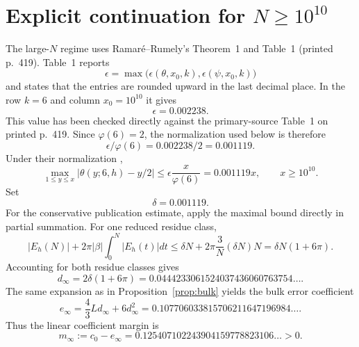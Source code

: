\documentclass[11pt]{article}
\theoremstyle{definition}
\newcommand{\RR}{Ramar\'{e}--Rumely}
\newcommand{\abs}[1]{\left|#1\right|}
\begin{document}
\section{Explicit continuation for $N\ge10^{10}$}\label{sec:largeN}

The large-$N$ regime uses \RR's Theorem~1 and Table~1 (printed p.~419). Table~1 reports
\[
\epsilon=\max\bigl(\epsilon(\theta,x_0,k),\epsilon(\psi,x_0,k)\bigr)
\]
and states that the entries are rounded upward in the last decimal place. In the row $k=6$ and column $x_0=10^{10}$ it gives
\begin{equation}\label{eq:epsilon}
\boxed{\epsilon=0.002238.}
\end{equation}
This value has been checked directly against the primary-source Table~1 on printed p.~419. Since $\varphi(6)=2$, the normalization used below is therefore
\[
\epsilon/\varphi(6)=0.002238/2=0.001119.
\]
Under their normalization \cite{RamareRumely1996},
\[
\max_{1\le y\le x}
\abs{\theta(y;6,h)-y/2}
\le\epsilon\frac{x}{\varphi(6)}
=0.001119x,
\qquad x\ge10^{10}.
\]
Set
\begin{equation}\label{eq:delta-large}
\delta=0.001119.
\end{equation}
For the conservative publication estimate, apply the maximal bound directly in partial summation. For one reduced residue class,
\[
\abs{E_h(N)}+2\pi\abs{\beta}\int_0^N\abs{E_h(t)}dt
\le\delta N+2\pi\frac3N(\delta N)N
=\delta N(1+6\pi).
\]
Accounting for both residue classes gives
\begin{equation}\label{eq:dinf}
\boxed{
d_\infty
=2\delta(1+6\pi)
=0.0444233061524037436060763754\ldots.
}
\end{equation}
The same expansion as in Proposition~\ref{prop:bulk} yields the bulk error coefficient
\begin{equation}\label{eq:einf}
\boxed{
e_\infty
=\frac43Ld_\infty+6d_\infty^2
=0.107706033815706211647196984\ldots.
}
\end{equation}
Thus the linear coefficient margin is
\begin{equation}\label{eq:minf}
\boxed{
m_\infty:=c_0-e_\infty
=0.125407102243904159778823106\ldots>0.
}
\end{equation}
\end{document}
